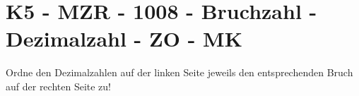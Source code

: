 \section{K5 - MZR - 1008 - Bruchzahl - Dezimalzahl - ZO - MK}

\begin{beispiel}[K5 - MZR]{1}
Ordne den Dezimalzahlen auf der linken Seite jeweils den entsprechenden Bruch auf der rechten Seite zu!
				
\end{beispiel}